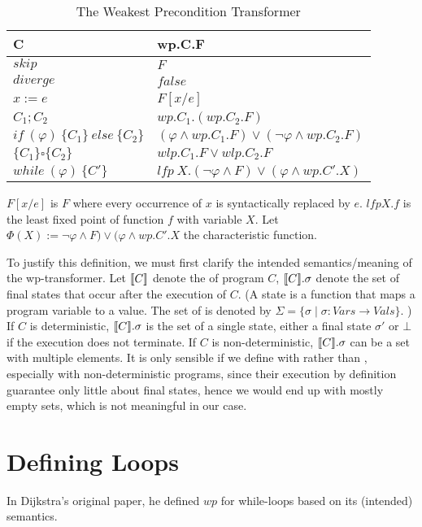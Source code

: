 \begin{table}[h!]\centering
    \begin{tabular}{ll}
      \textbf{C}&\textbf{wp.C.F}    \\ \hline
      $skip$&   $F$   \\
      $diverge$&  $false$\\
      $x:= e $&  $F[x/e]$\\
      $C_1;C_2$&  $wp.C_1.(wp.C_2.F)$\\
      $if\ (\varphi)\ \{C_1\}\ else\ \{C_2\} $&  $(\varphi\wedge wp.C_1.F)\vee(\neg\varphi\wedge wp.C_2.F)$\\
      $\{C_1\}\square \{C_2\}$ & $wlp.C_1.F\vee wlp.C_2.F$ \\
      $while\ (\varphi)\ \{C'\}$&  $lfp\ X.(\neg\varphi\wedge F)\vee(\varphi\wedge wp.C'.X)$\\
    \end{tabular}
    \caption{The Weakest Precondition Transformer}
\end{table}

$F[x/e]$ is $F$ where every occurrence of $x$ is syntactically replaced by $e$. 
$lfp X. f$ is the least fixed point of function $f$ with variable $X$. 
Let $\Phi(X):=\neg\varphi\wedge F)\vee(\varphi\wedge wp.C'.X$ the characteristic function. 

To justify this definition, we must first clarify the intended semantics/meaning of the wp-transformer. 
Let $\llbracket {C} \rrbracket$ denote the  of program $C$, $\llbracket {C} \rrbracket.\sigma$ denote the set of final states that  occur after the execution of $C$. 
(A state is a function that maps a program variable to a value. The set of  is denoted by $\Sigma=\{\sigma \mid \sigma: Vars\to Vals\}$. )
If $C$ is deterministic, $\llbracket {C} \rrbracket.\sigma$ is the set of a single state, either a final state $\sigma'$ or $\bot$ if the execution does not terminate. 
If $C$ is non-deterministic, $\llbracket {C} \rrbracket.\sigma$ can be a set with multiple elements. 
It is only sensible if we define with  rather than , especially with non-deterministic programs, since their execution by definition  guarantee only little about final states, hence we would end up with mostly empty sets, which is not meaningful in our case. 



\section{Defining Loops}
In Dijkstra's original paper\cite{Dijkstra1975}, he defined $wp$ for while-loops based on its (intended) semantics. 


